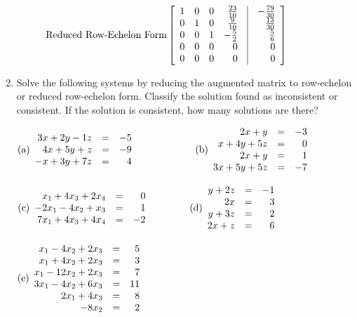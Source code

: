 \begin{enumerate}
\begin{description}
$\rm{\textrm{Reduced Row-Echelon Form}}\left[\begin{array}{rrrrcr}
                                                   1&0&0&\frac{23}{10}&\vline&-\frac{79}{30}\\
                                                   0&1&0&\frac{9}{10}&\vline&\frac{13}{30}\\
                                                   0&0&1&-\frac{5}{2}&\vline&\frac{5}{6}\\
                                                   0&0&0&0&\vline&0\\
                                                   0&0&0&0&\vline&0\end{array}\right]$
\end{description}
\item Solve the following systems by reducing the augmented matrix to row-echelon or reduced
row-echelon form. Classify the solution found as inconsistent or
consistent. If the solution is consistent, how many solutions are
there?

$
\rm{(a)} \begin{array}{rrr} 3x+2y-1z&=&-5\\ 4x+5y+z&=&-9\\
-x+3y+7z&=&4 \end{array} \quad \quad \quad \quad \quad \quad
\rm{(b)} \begin{array}{rrr} 2x+y&=&-3\\x+4y+5z&=&0\\
2x+y&=&1\\3x+5y+5z&=&-7 \end{array}$

$\rm{(c)} \begin{array}{rrr} x_1+4x_3+2x_4&=&0\\
-2x_1-4x_2+x_3&=&1 \\ 7x_1+4x_3+4x_4&=&-2
 \end{array} \quad \quad \quad \quad
\rm{(d)} \begin{array}{rrr} y+2z&=&-1\\ 2x&=&3\\ y+3z&=&2\\
2x+z&=&6 \end{array}$

$\rm{(e)} \begin{array}{rrr} x_1-4x_2+2x_3&=&5\\
x_1+4x_2+2x_3&=&3\\ x_1-12x_2+2x_3&=&7\\ 3x_1-4x_2+6x_3&=&11\\
2x_1+4x_3&=&8\\ -8x_2&=&2
\end{array}$


\end{enumerate}
